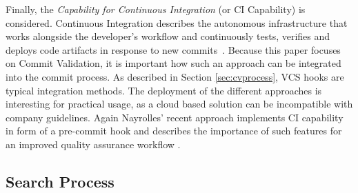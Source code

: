 Finally, the \textit{Capability for Continuous Integration} (or CI Capability) is considered. Continuous Integration describes the autonomous infrastructure that works alongside the developer's workflow and continuously tests, verifies and deploys code artifacts in response to new commits~\cite{booch1991object}.
Because this paper focuses on Commit Validation, it is important how such an approach can be integrated into the commit process. As described in Section \ref{sec:cvprocess}, VCS hooks are typical integration methods. The deployment of the different approaches is interesting for practical usage, as a cloud based solution can be incompatible with company guidelines. Again Nayrolles' recent approach implements CI capability in form of a pre-commit hook and describes the importance of such features for an improved quality assurance workflow \cite{Nayrolles2018}.


\subsection{Search Process}
\label{sec:searchprocess}

